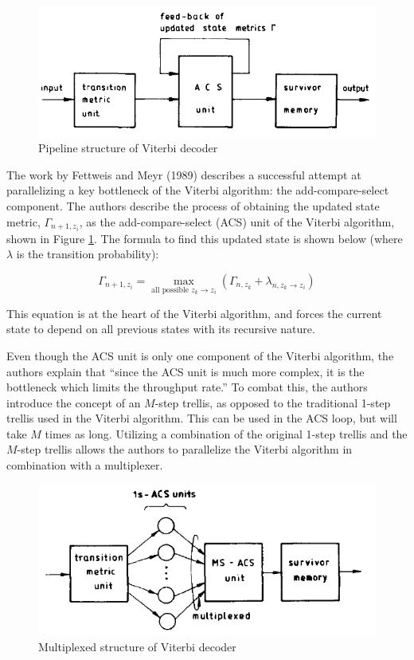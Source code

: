 \documentclass[11pt,onecolumn]{article}
\begin{document}

\begin{figure}[h!]
\centering
\includegraphics[width=.5\linewidth]{figures/pipeline}
\caption{Pipeline structure of Viterbi decoder}
\label{fig:pipeline}
\end{figure}

The work by Fettweis and Meyr (1989) \cite{acs:old} describes a successful attempt at parallelizing a key bottleneck of the Viterbi algorithm: the add-compare-select component. The authors describe the process of obtaining the updated state metric, $\Gamma_{n+1,z_{i}}$, as the add-compare-select (ACS) unit of the Viterbi algorithm, shown in Figure \ref{fig:pipeline}. The formula to find this updated state is shown below (where $\lambda$ is the transition probability):

\begin{equation}
\Gamma_{n+1,z_{i}} = \max\limits_{\text{all possible } z_{k}\rightarrow z_{i}} (\Gamma_{n,z_{k}} + \lambda_{n,z_{k}\rightarrow z_{i}})
\end{equation}

This equation is at the heart of the Viterbi algorithm, and forces the current state to depend on all previous states with its recursive nature. 

Even though the ACS unit is only one component of the Viterbi algorithm, the authors explain that ``since the ACS unit is much more complex, it is the bottleneck which limits the throughput rate.'' To combat this, the authors introduce the concept of an $M$-step trellis, as opposed to the traditional 1-step trellis used in the Viterbi algorithm. This can be used in the ACS loop, but will take $M$ times as long. Utilizing a combination of the original 1-step trellis and the $M$-step trellis allows the authors to parallelize the Viterbi algorithm in combination with a multiplexer.

\begin{figure}[h!]
\centering
\includegraphics[width=.5\linewidth]{figures/pipeline_multiplex}
\caption{Multiplexed structure of Viterbi decoder}
\label{fig:pipeline_multiplex}
\end{figure}
\end{document}
